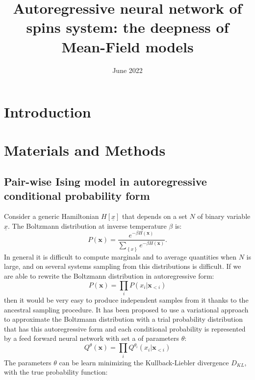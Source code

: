 \documentclass{article}
\title{Autoregressive neural network of spins system: the deepness of Mean-Field models}
\date{June 2022}
\begin{document}
\maketitle

\tableofcontents

\section{Introduction}

\section{Materials and Methods}
\subsection{Pair-wise Ising model in autoregressive conditional probability form}
Consider a generic Hamiltonian $H[\underline{x}]$ that depends on a set $N$ of binary variable $\underline{x}$. The Boltzmann distribution at inverse temperature $\beta$ is:
\begin{equation}
P\left(\mathbf{x}\right)=\frac{e^{-\beta H\left(\mathbf{x}\right)}}{\sum_{\left\{ x\right\} }e^{-\beta H\left(\mathbf{x}\right)}}.
\end{equation}
In general it is difficult to compute marginals and to average quantities when $N$ is large, and on several systems sampling from this distributions is difficult. If we are able to rewrite the Boltzmann distribution in autoregressive form:
\begin{equation}
P\left(\mathbf{x}\right)=\prod_{i}P\left(x_{i}|\mathbf{x}_{<i}\right)
\end{equation}
then it would be very easy to produce independent samples from it thanks to the ancestral sampling procedure. It has been proposed to use a variational approach to approximate the Boltzmann distribution with a trial probability distribution that has this autoregressive form and each conditional probability is represented by a feed forward neural network with set a of parameters ${\theta}$:
\begin{equation}
Q^{\theta}\left(\mathbf{x}\right)=\prod_{i}Q^{\theta_i}\left(x_{i}|\mathbf{x}_{<i}\right)
\end{equation}
The parameters ${\theta}$ can be learn minimizing the Kullback-Liebler divergence $D_{KL}$,
with the true probability function:
\end{document}

